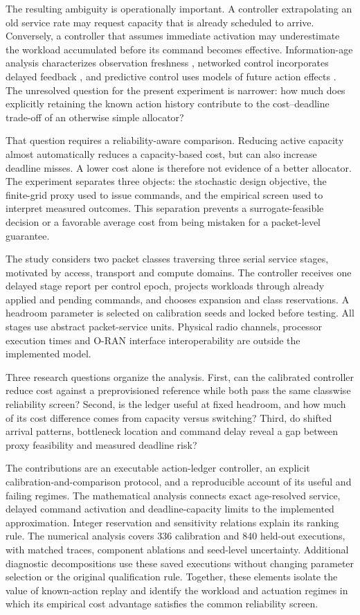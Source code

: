 \documentclass{IEEEoj}
\begin{document}
The resulting ambiguity is operationally important. A controller extrapolating
an old service rate may request capacity that is already scheduled to arrive.
Conversely, a controller that assumes immediate activation may underestimate
the workload accumulated before its command becomes effective. Information-age
analysis characterizes observation freshness \cite{age}, networked control
incorporates delayed feedback \cite{networked}, and predictive control uses
models of future action effects \cite{mpc}. The unresolved question for the
present experiment is narrower: how much does explicitly retaining the known
action history contribute to the cost--deadline trade-off of an otherwise
simple allocator?

That question requires a reliability-aware comparison. Reducing active capacity
almost automatically reduces a capacity-based cost, but can also increase
deadline misses. A lower cost alone is therefore not evidence of a better
allocator. The experiment separates three objects: the stochastic design
objective, the finite-grid proxy used to issue commands, and the empirical
screen used to interpret measured outcomes. This separation prevents a
surrogate-feasible decision or a favorable average cost from being mistaken
for a packet-level guarantee.

The study considers two packet classes traversing three serial service stages,
motivated by access, transport and compute domains. The controller receives
one delayed stage report per control epoch, projects workloads through already
applied and pending commands, and chooses expansion and class reservations.
A headroom parameter is selected on calibration seeds and locked before
testing. All stages use abstract packet-service units. Physical radio channels,
processor execution times and O-RAN interface interoperability are outside
the implemented model.

Three research questions organize the analysis. First, can the calibrated
controller reduce cost against a preprovisioned reference while both pass the
same classwise reliability screen? Second, is the ledger useful at fixed
headroom, and how much of its cost difference comes from capacity versus
switching? Third, do shifted arrival patterns, bottleneck location and command
delay reveal a gap between proxy feasibility and measured deadline risk?

The contributions are an executable action-ledger controller, an explicit
calibration-and-comparison protocol, and a reproducible account of its useful
and failing regimes. The mathematical analysis connects exact age-resolved service, delayed
command activation and deadline-capacity limits to the implemented approximation.
Integer reservation and sensitivity relations explain its ranking rule. The numerical
analysis covers 336 calibration and 840 held-out executions, with matched
traces, component ablations and seed-level uncertainty. Additional diagnostic
decompositions use these saved executions without changing parameter selection
or the original qualification rule. Together, these elements isolate the value of known-action replay and identify the workload and actuation regimes in which its empirical cost advantage satisfies the common reliability screen.
\end{document}
